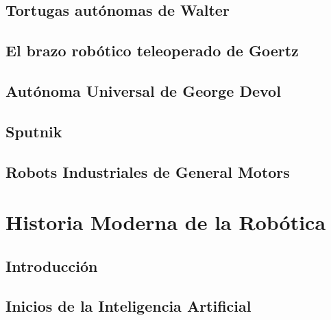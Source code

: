 \documentclass[a4paper,11pt]{article}
\begin{document}
\subsection{Tortugas autónomas de Walter}


\subsection{El brazo robótico teleoperado de Goertz}


\subsection{Autónoma Universal de George Devol}


\subsection{Sputnik}


\subsection{Robots Industriales de General Motors}


\newpage


\section{Historia Moderna de la Robótica}

\subsection{Introducción}


\subsection{Inicios de la Inteligencia Artificial}

\end{document}
